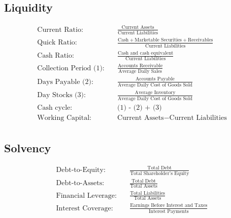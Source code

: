 \documentclass[12pt]{article}
\begin{document}
	\subsection{Liquidity}
	\begin{tcolorbox}
	\begin{align*}
		\text{Current Ratio:} \quad & \frac{\text{Current Assets}}{\text{Current Liabilities}} \\
		\text{Quick Ratio:} \quad & \frac{\text{Cash} + \text{Marketable Securities} + \text{Receivables}}{\text{Current Liabilities}} \\
		\text{Cash Ratio:} \quad & \frac{\text{Cash and cash equivalent}}{\text{Current Liabilities}}  \\
		\text{Collection Period (1):} \quad & \frac{\text{Accounts Receivable}}{\text{Average Daily Sales}} \\
		\text{Days Payable (2):} \quad & \frac{\text{Accounts Payable}}{\text{Average Daily Cost of Goods Sold}} \\
		\text{Day Stocks (3):} \quad & \frac{\text{Average Inventory}}{\text{Average Daily Cost of Goods Sold}} \\
		\text{Cash cycle:} \quad & \text{(1) - (2) + (3) } \\
		\text{Working Capital:} \quad & \text{Current Assets} - \text{Current Liabilities} \\
	\end{align*}
	\end{tcolorbox}
	\subsection{Solvency}
	\begin{tcolorbox}
	\begin{align*}
		\text{Debt-to-Equity:} \quad & \frac{\text{Total Debt}}{\text{Total Shareholder's Equity}} \\
		\text{Debt-to-Assets:} \quad & \frac{\text{Total Debt}}{\text{Total Assets}} \\
		\text{Financial Leverage:} \quad & \frac{\text{Total Liabilities}}{\text{Total Assets}} \\
		\text{Interest Coverage:} \quad & \frac{\text{Earnings Before Interest and Taxes}}{\text{Interest Payments}}
	\end{align*}
	\end{tcolorbox}
\end{document}
